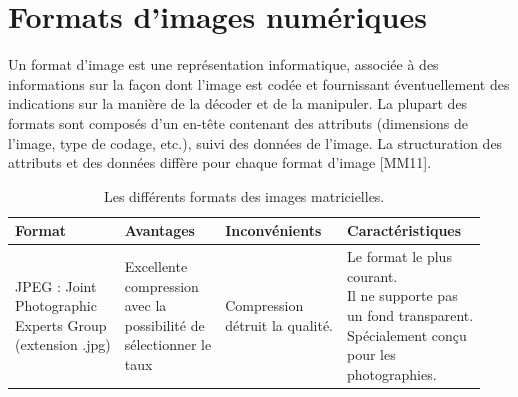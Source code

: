 \section{Formats d'images numériques}
Un format d'image est une représentation informatique, associée à des informations sur la façon dont l'image est codée et fournissant éventuellement des indications sur la manière de la décoder et de la manipuler. La plupart des formats sont composés d'un en-tête contenant des attributs (dimensions de l'image, type de codage, etc.), suivi des données de l'image. La structuration des attributs et des données diffère pour chaque format d'image [MM11].

\begin{table}[H]
	\centering
	\caption{Les différents formats des images matricielles.}
	\begin{tabular}{|l|l|l|l|}
		
		\hline
		\textbf{Format} & \textbf{Avantages} &
		\textbf{Inconvénients} & \textbf{Caractéristiques} \\
		\hline
		\makecell{JPEG : Joint\\
			Photographic\\
			Experts Group\\
			(extension
			.jpg)}
		& \makecell{Excellente\\
			compression\\
			avec la\\
			possibilité de\\
			sélectionner le\\
			taux} 
		& \makecell{Compression\\
			détruit la qualité.}
		&  \makecell{Le format le plus\\
			courant.\\
			Il ne supporte pas\\
			un fond transparent.\\
			Spécialement conçu\\
			pour les\\
			photographies.}   \\
		\hline
		

\end{tabular}
\end{table}

